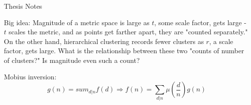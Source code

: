 \documentclass{article}
\begin{document}
\begin{center}{\Large Thesis Notes}\\ \vspace{1 ex} \end{center}


\vspace{2 ex}
\noindent

Big idea: Magnitude of a metric space is large as $t$, some scale factor, gets large - $t$ scales the metric, and as points get farther apart, they are "counted separately." On the other hand, hierarchical clustering records fewer clusters as $r$, a scale factor, gets large. What is the relationship between these two "counts of number of clusters?" Is magnitude even such a count?

Mobius inversion:
\[g(n) = sum_{d | n} f(d) \Rightarrow f(n) = \sum_{d | n} \mu(\frac dn) g(n)\] 
\end{document}
